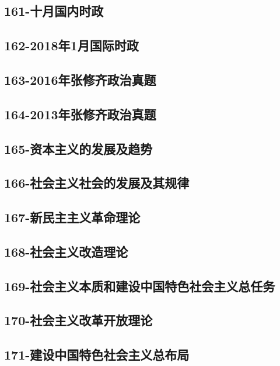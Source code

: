\subsection{161-十月国内时政}

\subsection{162-2018年1月国际时政}

\subsection{163-2016年张修齐政治真题}

\subsection{164-2013年张修齐政治真题}

\subsection{165-资本主义的发展及趋势}

\subsection{166-社会主义社会的发展及其规律}

\subsection{167-新民主主义革命理论}

\subsection{168-社会主义改造理论}

\subsection{169-社会主义本质和建设中国特色社会主义总任务}

\subsection{170-社会主义改革开放理论}

\subsection{171-建设中国特色社会主义总布局}

